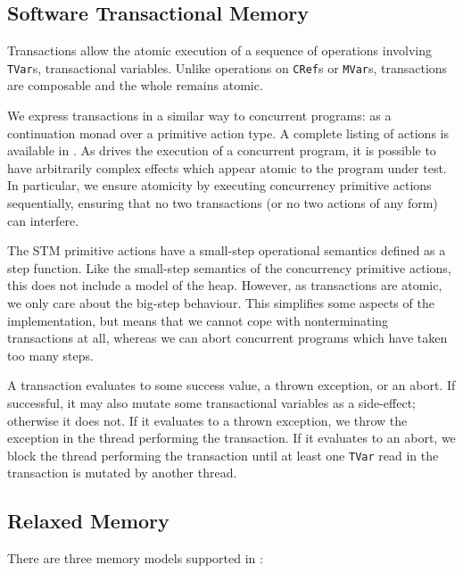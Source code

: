 \subsection{Software Transactional Memory}

Transactions allow the atomic execution of a sequence of operations involving
\verb|TVar|s, transactional variables.  Unlike operations on \verb|CRef|s or
\verb|MVar|s, transactions are composable and the whole remains atomic.

We express transactions in a similar way to concurrent programs: as a
continuation monad over a primitive action type.  A complete listing of actions
is available in .  As \dejafu{} drives the execution of a
concurrent program, it is possible to have arbitrarily complex effects which
appear atomic to the program under test.  In particular, we ensure atomicity by
executing concurrency primitive actions sequentially, ensuring that no two
transactions (or no two actions of any form) can interfere.

The STM primitive actions have a small-step operational semantics defined as a
step function.  Like the small-step semantics of the concurrency primitive
actions, this does not include a model of the heap.  However, as transactions
are atomic, we only care about the big-step behaviour.  This simplifies some
aspects of the implementation, but means that we cannot cope with nonterminating
transactions at all, whereas we can abort concurrent programs which have taken
too many steps.

A transaction evaluates to some success value, a thrown exception, or an abort.
If successful, it may also mutate some transactional variables as a side-effect;
otherwise it does not.  If it evaluates to a thrown exception, we throw the
exception in the thread performing the transaction.  If it evaluates to an
abort, we block the thread performing the transaction until at least one
\verb|TVar| read in the transaction is mutated by another thread.

\subsection{Relaxed Memory}

There are three memory models supported in \dejafu{}:

